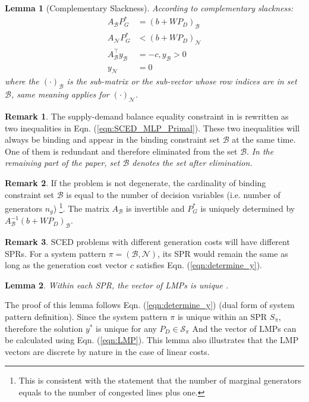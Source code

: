 \documentclass[letterpaper, 11pt]{article}
\theoremstyle{plain}
\newtheorem{lem}{Lemma}
\theoremstyle{definition}
\newtheorem{remark}{Remark}
\begin{document}
\begin{lem}[Complementary Slackness]
\label{lem:complementary_slackness}
According to complementary slackness:
\begin{subequations}
\label{eqn:complementary_slackness}
\begin{align}
A_{\mathcal{B}} P_G^* &= (b+WP_D)_{\mathcal{B}} \label{eqn:B_primal}\\
A_{\mathcal{N}}P_G^* &< (b+WP_D)_{\mathcal{N}} \label{eqn:N_primal}\\
A_{\mathcal{B}}^\intercal y_{\mathcal{B}} &= -c, y_{\mathcal{B}} > 0 \label{eqn:determine_y}\\
y_{\mathcal{N}} &= 0  
\end{align}
\end{subequations}
where the $(\cdot)_{\mathcal{B}}$ is the sub-matrix or the sub-vector whose row indices are in set $\mathcal{B}$, same meaning applies for $(\cdot)_{\mathcal{N}}$.
\end{lem}

\begin{remark}
The supply-demand balance equality constraint in is rewritten as two inequalities in Eqn. (\ref{eqn:SCED_MLP_Primal}). These two inequalities will always be binding and appear in the binding constraint set $\mathcal{B}$ at the same time. One of them is redundant and therefore eliminated from the set $\mathcal{B}$. \emph{In the remaining part of the paper, set $\mathcal{B}$ denotes the set after elimination. }
\end{remark}
\begin{remark}
If the problem is not degenerate, the cardinality of binding constraint set $\mathcal{B}$ is equal to the number of decision variables (i.e. number of generators $n_g$) \footnote{This is consistent with the statement that the number of marginal generators equals to the number of congested lines plus one.}.
The matrix $A_{\mathcal{B}}$ is invertible and $P_G^*$ is uniquely determined by $A_{\mathcal{B}}^{-1}(b+WP_D)_{\mathcal{B}}$.
\end{remark}

\begin{remark}
SCED problems with different generation costs will have different SPRs.
For a system pattern $\pi = (\mathcal{B},\mathcal{N})$, its SPR would remain the same as
long as the generation cost vector $c$ satisfies Eqn. (\ref{eqn:determine_y}).
\end{remark}

\begin{lem}
Within each SPR, the vector of LMPs is unique \cite{Ji}\cite{Geng2015}.
\end{lem}
The proof of this lemma follows Eqn. (\ref{eqn:determine_y}) (dual form of system pattern definition).
Since the system pattern $\pi$ is unique within an SPR $S_{\pi}$, therefore the solution $y^*$ is unique for any $P_D \in \mathcal{S}_{\pi}$
And the vector of LMPs can be calculated using Eqn. (\ref{eqn:LMP}). This lemma also illustrates that the LMP vectors are discrete by nature in the case of linear costs.
\end{document}
